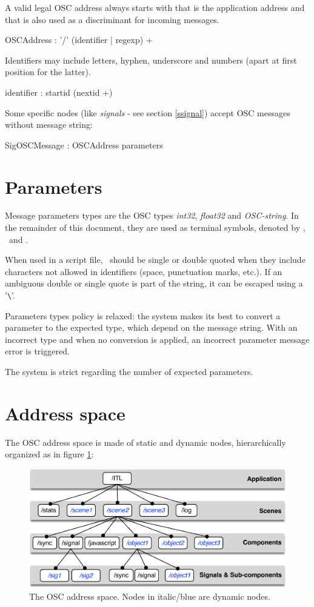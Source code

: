 \documentclass[a4paper,twoside]{report}
\newcommand{\sublevel}[1]	{\section{#1}}
\begin{document}
\note{} A valid legal OSC address always starts with  that is the application address and that is also used as a discriminant for incoming messages.
\begin{rail}
OSCAddress : '/' (identifier | regexp) +
\end{rail}

Identifiers may include letters, hyphen, underscore and numbers (apart at first position for the latter).
\railalias{nextid}{[-\_a-zA-Z0-9]]}
\begin{rail}
identifier : startid (nextid +)
\end{rail}

Some specific nodes (like \emph{signals} - see section \ref{ssignal}) accept OSC messages without message string:
\begin{rail}
SigOSCMessage : OSCAddress parameters
\end{rail}

\sublevel{Parameters}
\label{params}
Message parameters types are the OSC types \emph{int32}, \emph{float32} and \emph{OSC-string}. In the remainder of this document, they are used as terminal symbols, denoted by \oscint, \oscfloat\ and \oscstring. 

When used in a script file, \oscstring\ should be single or double quoted when they include characters not allowed in identifiers (space, punctuation marks, etc.).
If an ambiguous double or single quote is part of the string, it can be escaped using a '\verb+\+'.

Parameters types policy is relaxed: the system makes its best to convert a parameter to the expected type, which depend on the message string. With an incorrect type and when no conversion is applied, an incorrect parameter message error is triggered.

The system is strict regarding the number of expected parameters.


\sublevel{Address space}
\label{addrspace}
The OSC address space is made of static and dynamic nodes, hierarchically organized as in figure \ref{fig:addrspace}:

\begin{figure}[H]
	\centering \includegraphics[width=120mm]{imgs/address_space}
 \caption{The OSC address space. Nodes in italic/blue are dynamic nodes.}
 \label{fig:addrspace}
\end{figure}
\end{document}
